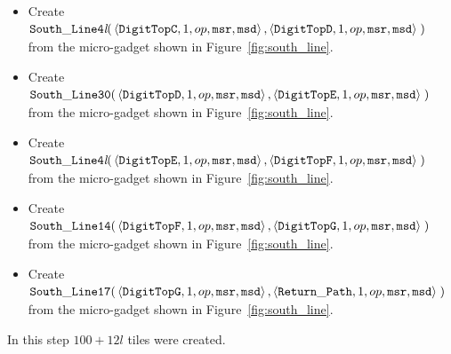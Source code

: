 \begin{itemize}
\begin{itemize}
            \item Create
            $\begin{aligned}[t]
                {\tt South\_Line4\textit{l}}(& \left\langle {\tt DigitTopC}, 1, op, {\tt msr}, {\tt msd}\right\rangle,
                                               \left\langle {\tt DigitTopD}, 1, op, {\tt msr}, {\tt msd}\right\rangle \;)
            \end{aligned}$\\from the micro-gadget shown in Figure~\ref{fig:south_line}.

            \item Create
            $\begin{aligned}[t]
                {\tt South\_Line30}(& \left\langle {\tt DigitTopD}, 1, op, {\tt msr}, {\tt msd}\right\rangle,
                                      \left\langle {\tt DigitTopE}, 1, op, {\tt msr}, {\tt msd}\right\rangle \;)
            \end{aligned}$\\from the micro-gadget shown in Figure~\ref{fig:south_line}.

            \item Create
            $\begin{aligned}[t]
                {\tt South\_Line4\textit{l}}(& \left\langle {\tt DigitTopE}, 1, op, {\tt msr}, {\tt msd}\right\rangle,
                                               \left\langle {\tt DigitTopF}, 1, op, {\tt msr}, {\tt msd}\right\rangle \;)
            \end{aligned}$\\ from the micro-gadget shown in Figure~\ref{fig:south_line}.

            \item Create
            $\begin{aligned}[t]
                {\tt South\_Line14}(& \left\langle {\tt DigitTopF}, 1, op, {\tt msr}, {\tt msd}\right\rangle,
                                      \left\langle {\tt DigitTopG}, 1, op, {\tt msr}, {\tt msd}\right\rangle \;)
            \end{aligned}$\\ from the micro-gadget shown in Figure~\ref{fig:south_line}.

            \item Create
            $\begin{aligned}[t]
                {\tt South\_Line17}(& \left\langle {\tt DigitTopG}, 1, op, {\tt msr}, {\tt msd} \right\rangle,
                                      \left\langle {\tt Return\_Path},     1, op, {\tt msr}, {\tt msd} \right\rangle \;)
            \end{aligned}$\\from the micro-gadget shown in Figure~\ref{fig:south_line}.
        \end{itemize}
        In this step $100 + 12l$ tiles were created.
        \vspace{1cm}



\end{itemize}
